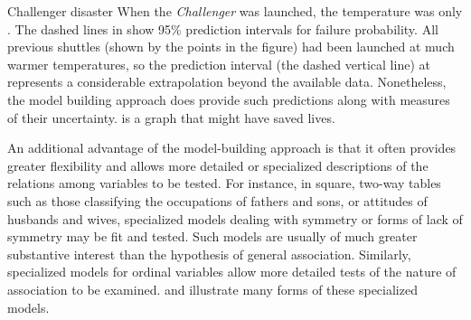 \begin{Example}[nasa0]{Challenger disaster}
When the \emph{Challenger} was launched, the temperature was only .
The dashed lines in  show 95\% prediction intervals
for failure probability.  All previous shuttles (shown by the points
in the figure) had been launched at much warmer temperatures, so the
prediction interval (the dashed vertical line)
at  represents a considerable extrapolation
beyond the available data.  Nonetheless, the model building approach
does provide such predictions along with measures of their uncertainty.
 is a graph
that might have saved lives.
\end{Example}

An additional advantage of the model-building approach is that it often
provides greater flexibility and allows more detailed or specialized
descriptions of the relations among variables to be tested.
For instance, in square, two-way tables such as those classifying
the occupations of fathers and sons, or attitudes of husbands and wives,
specialized models dealing with symmetry or forms of lack of symmetry
may be fit and tested.  Such models are usually of much greater
substantive interest than the hypothesis of general association.
Similarly, specialized models for ordinal variables allow more detailed
tests of the nature of association to be examined.
 and
 illustrate many forms of these
specialized models.


 

